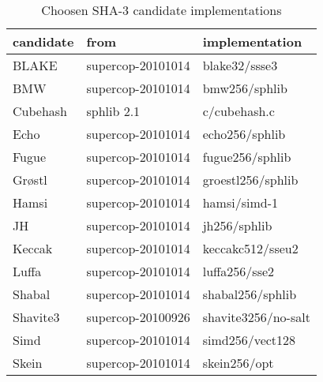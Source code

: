 \begin{table}
  \centering
  \begin{tabular}{ | l | l | l | }
    \hline
    \textbf{candidate} & \textbf{from} & \textbf{implementation} \\ \hline
     BLAKE      & supercop-20101014 & blake32/ssse3     \\ \hline
     \ac{BMW}   & supercop-20101014 & bmw256/sphlib     \\ \hline
     Cubehash   & sphlib 2.1        & c/cubehash.c      \\ \hline
     Echo       & supercop-20101014 & echo256/sphlib    \\ \hline
     Fugue      & supercop-20101014 & fugue256/sphlib   \\ \hline
     Grøstl     & supercop-20101014 & groestl256/sphlib \\ \hline
     Hamsi      & supercop-20101014 & hamsi/simd-1      \\ \hline
     JH         & supercop-20101014 & jh256/sphlib      \\ \hline
     Keccak     & supercop-20101014 & keccakc512/sseu2  \\ \hline
     Luffa      & supercop-20101014 & luffa256/sse2     \\ \hline
     Shabal     & supercop-20101014 & shabal256/sphlib  \\ \hline
     Shavite3   & supercop-20100926 & shavite3256/no-salt       \\ \hline
     Simd       & supercop-20101014 & simd256/vect128   \\ \hline
     Skein      & supercop-20101014 & skein256/opt      \\ \hline
  \end{tabular}
  \caption{Choosen \ac{SHA}-3 candidate implementations}
  \label{tbl:sha3:implementations}
\end{table}
